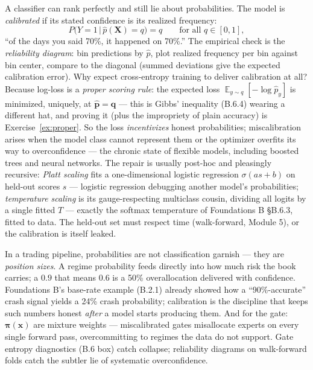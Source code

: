 \documentclass[11pt]{article}
\numberwithin{equation}{section}
\theoremstyle{plain}
\theoremstyle{definition}
\theoremstyle{remark}
\DeclareMathOperator{\E}{\mathbb{E}}
\newcommand{\x}{\bm{x}}
\begin{document}
A classifier can rank perfectly and still lie about probabilities. The model is \emph{calibrated} if its stated confidence is its realized frequency:
\begin{equation}
P\big(Y = 1 \,\big|\, \hat p(\bm{X}) = q\big) = q \qquad \text{for all } q \in [0,1],
\label{eq:calibration}
\end{equation}
``of the days you said 70\%, it happened on 70\%.'' The empirical check is the \emph{reliability diagram}: bin predictions by $\hat p$, plot realized frequency per bin against bin center, compare to the diagonal (summed deviations give the expected calibration error). Why expect cross-entropy training to deliver calibration at all? Because log-loss is a \emph{proper scoring rule}: the expected loss $\E_{y \sim q}[-\log \hat p_y]$ is minimized, uniquely, at $\hat{\bm p} = \bm{q}$ --- this is Gibbs' inequality (B.6.4) wearing a different hat, and proving it (plus the impropriety of plain accuracy) is Exercise~\ref{ex:proper}. So the loss \emph{incentivizes} honest probabilities; miscalibration arises when the model class cannot represent them or the optimizer overfits its way to overconfidence --- the chronic state of flexible models, including boosted trees and neural networks. The repair is usually post-hoc and pleasingly recursive: \emph{Platt scaling} fits a one-dimensional logistic regression $\sigma(a s + b)$ on held-out scores $s$ --- logistic regression debugging another model's probabilities; \emph{temperature scaling} is its gauge-respecting multiclass cousin, dividing all logits by a single fitted $T$ --- exactly the softmax temperature of Foundations B \S B.6.3, fitted to data. The held-out set must respect time (walk-forward, Module 5), or the calibration is itself leaked.

\begin{finbox}
In a trading pipeline, probabilities are not classification garnish --- they are \emph{position sizes}. A regime probability feeds directly into how much risk the book carries; a $0.9$ that means $0.6$ is a 50\% overallocation delivered with confidence. Foundations B's base-rate example (B.2.1) already showed how a ``90\%-accurate'' crash signal yields a 24\% crash probability; calibration is the discipline that keeps such numbers honest \emph{after} a model starts producing them. And for the gate: $\bm{\pi}(\x)$ are mixture weights --- miscalibrated gates misallocate experts on every single forward pass, overcommitting to regimes the data do not support. Gate entropy diagnostics (B.6 box) catch collapse; reliability diagrams on walk-forward folds catch the subtler lie of systematic overconfidence.
\end{finbox}
\end{document}
